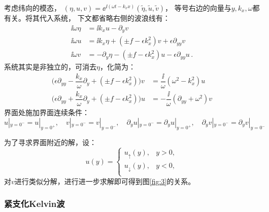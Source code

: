 \documentclass[UTF8,zihao=5]{ctexart} %
\begin{document}
考虑纬向的模态，
$(\eta, u, v) = \ee^{\ii (\omega t -k_x x)}(\tilde \eta, \tilde u, \tilde v)$，
等号右边的向量与$y,k_x,\omega$都有关。将其代入系统，
下文都省略右侧的波浪线有：
\begin{align}
    \ii \omega \eta & = \ii k_x u - \partial_y v \label{eq:first}                                        \\
    \ii \omega u    & = \ii k_x \eta + (\pm f - \epsilon  k_x^2) v + \epsilon  \partial_{yy} v           \\
    \ii \omega v    & = -\partial_y \eta - (\pm f - \epsilon  k_x^2) u - \epsilon  \partial_{yy} u  \, .
\end{align}
系统其实是非独立的，可消去$\eta$，化简为：
\begin{align}
    \label{eq:interface_ode_v}\big(\epsilon  \partial_{yy}  - \dfrac{k_x}{\omega} \partial_y  + (\pm f - \epsilon  k_x^2)\big)v & = \dfrac{\ii}{\omega}(\omega^2-k_x^2) u          \\
    \label{eq:interface_ode_u}\big(\epsilon  \partial_{yy}  + \dfrac{k_x}{\omega} \partial_y  + (\pm f - \epsilon  k_x^2)\big)u & = -\dfrac{\ii}{\omega}(\partial_{yy}+\omega^2) v
\end{align}
界面处施加界面连续条件：
\begin{equation}\label{eq:interface_gluing}
    u|_{y=0^-} = u|_{y=0^+}, \quad v|_{y=0^-} = v|_{y=0^-}, \quad \partial_y u|_{y=0^-} = \partial_y u|_{y=0^+}, \quad \partial_y v|_{y=0^-} = \partial_y v|_{y=0^-}
\end{equation}

为了寻求界面附近的解，设：
\begin{equation}
    u(y) = \left\lbrace \begin{array}{ll}
        u_\uparrow(y),   & y>0, \\
        u_\downarrow(y), & y<0, \\
    \end{array}\right.
\end{equation}
对$v$进行类似分解，进行进一步求解即可得到图\ref{fig:3}的关系。

\subsubsection{紧支化Kelvin波}
\end{document}
